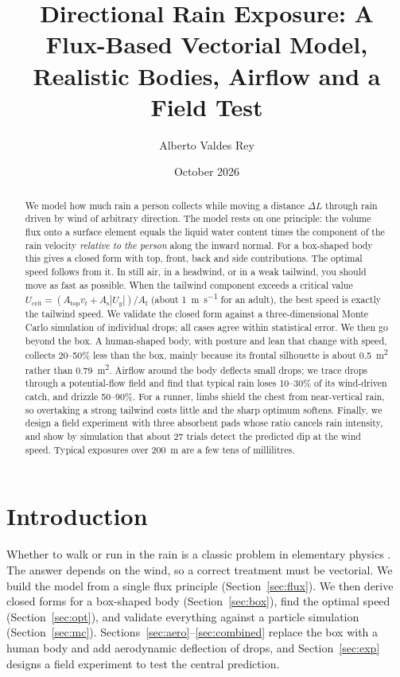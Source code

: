 \documentclass[11pt,a4paper]{article}
\title{Directional Rain Exposure: A Flux-Based Vectorial Model,\\ Realistic Bodies, Airflow and a Field Test}
\author{Alberto Valdes Rey}
\date{October 2026}
\newcommand{\Atop}{A_{\mathrm{top}}}
\newcommand{\Af}{A_{\mathrm{f}}}
\newcommand{\As}{A_{\mathrm{s}}}
\newcommand{\Ucrit}{U_{\mathrm{crit}}}
\begin{document}
\maketitle

\begin{abstract}
We model how much rain a person collects while moving a distance $\Delta L$ through rain driven by wind of arbitrary direction. The model rests on one principle: the volume flux onto a surface element equals the liquid water content times the component of the rain velocity \emph{relative to the person} along the inward normal. For a box-shaped body this gives a closed form with top, front, back and side contributions. The optimal speed follows from it. In still air, in a headwind, or in a weak tailwind, you should move as fast as possible. When the tailwind component exceeds a critical value $\Ucrit=(\Atop v_t+\As|U_y|)/\Af$ (about \SI{1}{\metre\per\second} for an adult), the best speed is exactly the tailwind speed. We validate the closed form against a three-dimensional Monte Carlo simulation of individual drops; all cases agree within statistical error. We then go beyond the box. A human-shaped body, with posture and lean that change with speed, collects 20--50\% less than the box, mainly because its frontal silhouette is about \SI{0.5}{m^2} rather than \SI{0.79}{m^2}. Airflow around the body deflects small drops; we trace drops through a potential-flow field and find that typical rain loses 10--30\% of its wind-driven catch, and drizzle 50--90\%. For a runner, limbs shield the chest from near-vertical rain, so overtaking a strong tailwind costs little and the sharp optimum softens. Finally, we design a field experiment with three absorbent pads whose ratio cancels rain intensity, and show by simulation that about 27 trials detect the predicted dip at the wind speed. Typical exposures over \SI{200}{m} are a few tens of millilitres.
\end{abstract}

\section{Introduction}
Whether to walk or run in the rain is a classic problem in elementary physics \cite{holden1995,ehrmann2011,bocci2012}. The answer depends on the wind, so a correct treatment must be vectorial. We build the model from a single flux principle (Section~\ref{sec:flux}). We then derive closed forms for a box-shaped body (Section~\ref{sec:box}), find the optimal speed (Section~\ref{sec:opt}), and validate everything against a particle simulation (Section~\ref{sec:mc}). Sections~\ref{sec:aero}--\ref{sec:combined} replace the box with a human body and add aerodynamic deflection of drops, and Section~\ref{sec:exp} designs a field experiment to test the central prediction.
\end{document}
